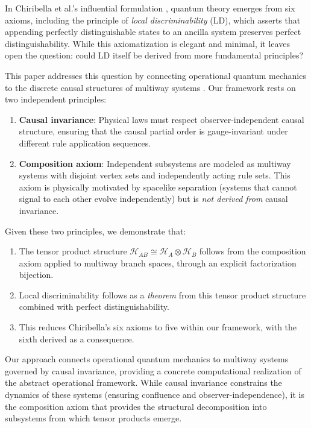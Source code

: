 \documentclass[11pt,a4paper]{article}
\theoremstyle{definition}
\theoremstyle{remark}
\newcommand{\Hilb}{\mathcal{H}}
\begin{document}
In Chiribella et al.'s influential formulation
\cite{chiribella2011informational}, quantum theory emerges from six
axioms, including the principle of \textit{local discriminability} (LD),
which asserts that appending perfectly distinguishable states to an
ancilla system preserves perfect distinguishability. While this
axiomatization is elegant and minimal, it leaves open the question: could
LD itself be derived from more fundamental principles?

This paper addresses this question by connecting operational quantum
mechanics to the discrete causal structures of multiway systems
\cite{wolfram2020new,gorard2020some}. Our framework rests on two
independent principles:

\begin{enumerate}
\item \textbf{Causal invariance}: Physical laws must respect
  observer-independent causal structure, ensuring that the causal partial
  order is gauge-invariant under different rule application sequences.
\item \textbf{Composition axiom}: Independent subsystems are modeled as
  multiway systems with disjoint vertex sets and independently acting
  rule sets. This axiom is physically motivated by spacelike separation
  (systems that cannot signal to each other evolve independently) but is
  \textit{not derived from} causal invariance.
\end{enumerate}

Given these two principles, we demonstrate that:

\begin{enumerate}
\item The tensor product structure $\Hilb_{AB} \cong \Hilb_A \otimes
  \Hilb_B$ follows from the composition axiom applied to multiway branch
  spaces, through an explicit factorization bijection.
\item Local discriminability follows as a \textit{theorem} from this
  tensor product structure combined with perfect distinguishability.
\item This reduces Chiribella's six axioms to five within our framework,
  with the sixth derived as a consequence.
\end{enumerate}

Our approach connects operational quantum mechanics to multiway systems
governed by causal invariance, providing a concrete computational
realization of the abstract operational framework. While causal invariance
constrains the dynamics of these systems (ensuring confluence and
observer-independence), it is the composition axiom that provides the
structural decomposition into subsystems from which tensor products
emerge.
\end{document}
